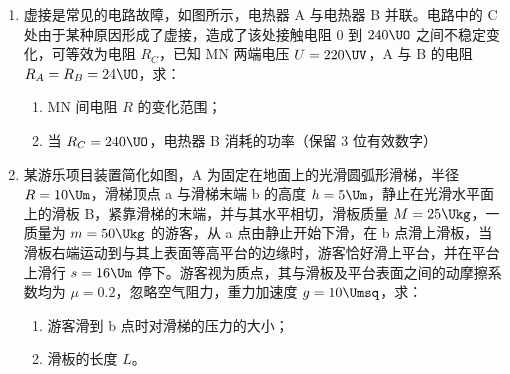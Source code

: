 \documentclass[\gkver]{gaokaozhenti}
\begin{document}
\begin{enumerate}
\item
虚接是常见的电路故障，如图所示，电热器 A 与电热器 B 并联。电路中的 C 处由于某种原因形成了虚接，造成了该处接触电阻 $0$ 到 $240 \UO$ 之间不稳定变化，可等效为电阻 $R_{C}$，已知 MN 两端电压 $U = 220 \UV$，A 与 B 的电阻 $R_{A} = R_{B} = 24 \UO$，求：
\begin{enumerate}
	\item
	MN 间电阻 $R$ 的变化范围；
	\item
	当 $R_{C} = 240 \UO$，电热器 B 消耗的功率（保留 3 位有效数字）
\end{enumerate}

\item
某游乐项目装置简化如图，A 为固定在地面上的光滑圆弧形滑梯，半径 $R = 10 \Um$，滑梯顶点 a 与滑梯末端 b 的高度 $h = 5 \Um$，静止在光滑水平面上的滑板 B，紧靠滑梯的末端，并与其水平相切，滑板质量 $M = 25 \Ukg$，一质量为 $m = 50 \Ukg$ 的游客，从 a 点由静止开始下滑，在 b 点滑上滑板，当滑板右端运动到与其上表面等高平台的边缘时，游客恰好滑上平台，并在平台上滑行 $s = 16 \Um$ 停下。游客视为质点，其与滑板及平台表面之间的动摩擦系数均为 $\mu = 0.2$，忽略空气阻力，重力加速度 $g = 10 \Umsq$，求：
\begin{enumerate}
	\item
	游客滑到 b 点时对滑梯的压力的大小；
	\item
	滑板的长度 $L$。
\end{enumerate}
\jdanswer{
\begin{enumerate}
	\item
	$1000 \UN$


\end{enumerate}}
\end{enumerate}
\end{document}
